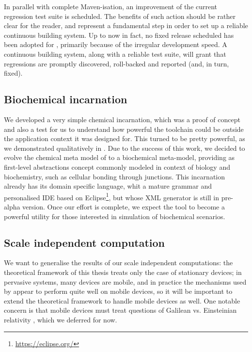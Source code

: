 \documentclass[12pt,a4paper,twoside,openright]{book}
\begin{document}
In parallel with complete Maven-isation, an improvement of the current regression test suite is scheduled.
%
The benefits of such action should be rather clear for the reader, and represent a fundamental step in order to set up a reliable continuous building system.
%
Up to now in fact, no fixed release scheduled has been adopted for \alchemist{}, primarily because of the irregular development speed.
%
A continuous building system, along with a reliable test suite, will grant that regressions are promptly discovered, roll-backed and reported (and, in turn, fixed).

\subsection{Biochemical incarnation}

We developed a very simple chemical incarnation, which was a proof of concept and also a test for us to understand how powerful the toolchain could be outside the application context it was designed for.
%
This turned to be pretty powerful, as we demonstrated qualitatively in .
%
Due to the success of this work, we decided to evolve the chemical meta model of \alchemist{} to a biochemical meta-model, providing as first-level abstractions concept commonly modeled in context of biology and biochemistry, such as cellular bonding through junctions.
%
This incarnation already has its domain specific language, whit a mature grammar and personalised IDE based on Eclipse\footnote{\url{https://eclipse.org/}}, but whose XML generator is still in pre-alpha version.
%
Once our effort is complete, we expect the tool to become a powerful utility for those interested in simulation of biochemical scenarios.

\subsection{Scale independent computation}

We want to generalise the results of our scale independent computations: the theoretical framework of this thesis treats only the case of stationary devices; in pervasive systems, many devices are mobile, and in practice the mechanisms used by \calculus{} appear to perform quite well on mobile devices, so it will be important to extend the theoretical framework
to handle mobile devices as well.
%
One notable concern is that mobile devices must treat questions of Galilean vs. Einsteinian relativity \cite{RelativityIntroduction}, which we deferred for now.
\end{document}
